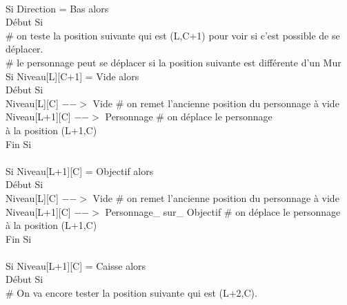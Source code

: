 \documentclass{article}
\begin{document}
\begin{tabbing}
\\	\hspace{2cm} Si Direction = Bas alors
\\	\hspace{2cm} Début Si
\\	\hspace{3cm}	\# on teste la position suivante qui est (L,C+1)	pour voir si c'est possible de se déplacer.
\\	\hspace{3cm}	\# le personnage peut se déplacer si la position suivante est différente d'un Mur		\\	\hspace{3cm}	Si Niveau[L][C+1] = Vide alors			
\\	\hspace{3cm}	Début Si
\\	\hspace{4cm}		Niveau[L][C] $-->$ Vide 		\# on remet l'ancienne position du personnage à vide
\\	\hspace{4cm}		Niveau[L+1][C] $-->$ Personnage	\# on déplace le personnage 
\\ \hspace{4cm} à la position (L+1,C)
\\	\hspace{3cm}	Fin Si 
\\		
\\	\hspace{3cm}	Si Niveau[L+1][C] = Objectif alors			
\\	\hspace{3cm}	Début Si
\\	\hspace{4cm}		Niveau[L][C] $-->$ Vide 				\# on remet l'ancienne position du personnage à vide
\\	\hspace{4cm}		Niveau[L+1][C] $-->$ Personnage\_ sur\_ Objectif	\# on déplace le personnage
\\ \hspace{4cm} à la position (L+1,C)
\\	\hspace{3cm}	Fin Si 
\\		
\\	\hspace{3cm}	Si Niveau[L+1][C] = Caisse alors			
\\	\hspace{3cm}	Début Si
\\	\hspace{4cm}		\# On va encore tester la position suivante qui est (L+2,C). 

\end{tabbing}
\end{document}
